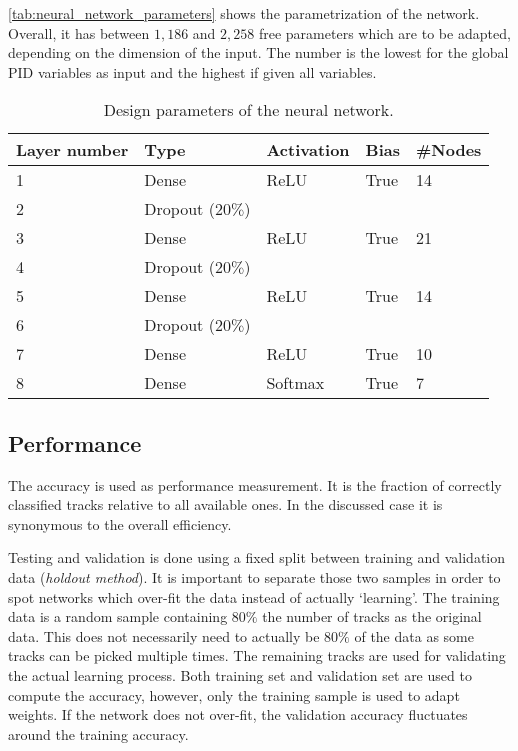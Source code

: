 \autoref{tab:neural_network_parameters} shows the parametrization of the network. Overall, it has between $1,186$ and $2,258$ free parameters which are to be adapted, depending on the dimension of the input. The number is the lowest for the global PID variables as input and the highest if given all variables.

\begin{table}[ht]
	\centering
	\begin{tabular}{l|llll}
		Layer number & Type & Activation & Bias & \#Nodes  \\
		\hline
		1 & Dense & ReLU & True & 14 \\
		2 & Dropout ($20\%$) \\
		3 & Dense & ReLU & True & 21 \\
		4 & Dropout ($20\%$) \\
		5 & Dense & ReLU & True & 14 \\
		6 & Dropout ($20\%$) \\
		7 & Dense & ReLU & True & 10 \\
		8 & Dense & Softmax & True & 7
	\end{tabular}
	\caption{Design parameters of the neural network.}
	\label{tab:neural_network_parameters}
\end{table}

\subsection{Performance}
\label{sec:neural_network_performance}

The accuracy is used as performance measurement. It is the fraction of correctly classified tracks relative to all available ones. In the discussed case it is synonymous to the overall efficiency.

Testing and validation is done using a fixed split between training and validation data (\textit{holdout method}). It is important to separate those two samples in order to spot networks which over-fit the data instead of actually `learning'. The training data is a random sample containing $80\%$ the number of tracks as the original data. This does not necessarily need to actually be $80\%$ of the data as some tracks can be picked multiple times. The remaining tracks are used for validating the actual learning process. Both training set and validation set are used to compute the accuracy, however, only the training sample is used to adapt weights. If the network does not over-fit, the validation accuracy fluctuates around the training accuracy.

